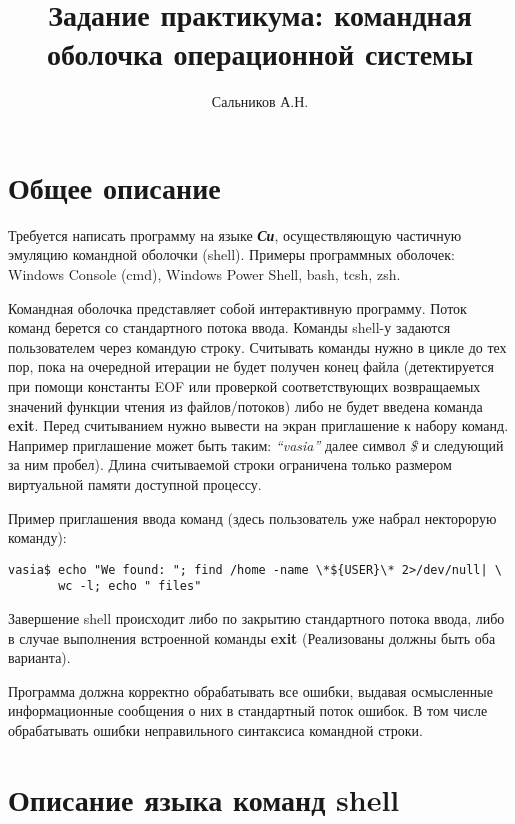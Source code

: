 \documentclass[11pt, a4paper]{article}
\title{Задание практикума: командная оболочка операционной системы}
\author{Сальников А.Н.}
\date{}
\begin{document}
\maketitle

\tableofcontents

\section{Общее описание}

Требуется написать программу на языке \textbf{\textit{Си}}, осуществляющую частичную 
эмуляцию командной оболочки (shell). Примеры программных оболочек:
{
Windows Console (cmd)\cite{cmd}, Windows Power Shell\cite{Power_Shell}, bash\cite{guide-eng},
tcsh\cite{tcsh}, zsh\cite{zsh}.}

Командная оболочка представляет собой интерактивную программу. Поток команд берется со 
стандартного потока ввода. Команды shell-у задаются пользователем через командую строку. 
Считывать команды нужно в цикле до тех пор, пока на очередной итерации не будет получен конец 
файла (детектируется при помощи константы EOF или проверкой соответствующих возвращаемых значений 
функции чтения из файлов/потоков) либо не будет введена команда \textbf{exit}. Перед считыванием 
нужно вывести на экран приглашение к набору команд. Например приглашение может быть таким: 
\textit{``vasia''} далее символ \textit{\$} и следующий за ним пробел).
Длина считываемой строки ограничена только размером
виртуальной памяти доступной процессу.

Пример приглашения ввода команд (здесь пользователь уже набрал некторорую команду):
{\small
\begin{verbatim}
vasia$ echo "We found: "; find /home -name \*${USER}\* 2>/dev/null| \
       wc -l; echo " files"
\end{verbatim}
}

Завершение shell происходит либо по закрытию стандартного потока ввода, либо в случае 
выполнения встроенной команды  \textbf{exit} (Реализованы должны быть оба варианта).

Программа должна корректно обрабатывать все ошибки, выдавая осмысленные информационные сообщения о них
в стандартный поток ошибок. В том числе обрабатывать ошибки неправильного синтаксиса командной строки. 

\section{Описание языка команд shell}
\end{document}
